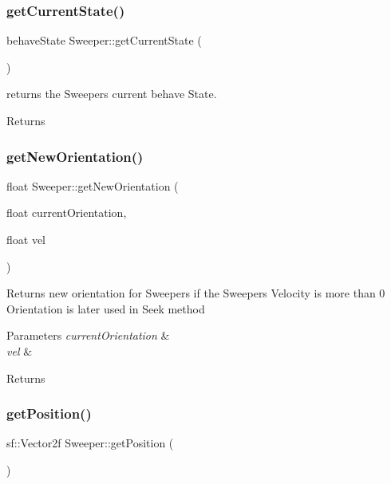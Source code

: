 \subsubsection{\texorpdfstring{getCurrentState()}{getCurrentState()}}
{\footnotesize\ttfamily behave\+State Sweeper\+::get\+Current\+State (\begin{DoxyParamCaption}{ }\end{DoxyParamCaption})}



returns the Sweepers current behave State. 

\begin{DoxyReturn}{Returns}

\end{DoxyReturn}
\mbox{\label{class_sweeper_a8bf97c85c79f5e2fef3c9822eb304596}} 
\subsubsection{\texorpdfstring{getNewOrientation()}{getNewOrientation()}}
{\footnotesize\ttfamily float Sweeper\+::get\+New\+Orientation (\begin{DoxyParamCaption}\item[{float}]{current\+Orientation,  }\item[{float}]{vel }\end{DoxyParamCaption})}



Returns new orientation for Sweepers if the Sweepers Velocity is more than 0 Orientation is later used in Seek method 


\begin{DoxyParams}{Parameters}
{\em current\+Orientation} & \\
\hline
{\em vel} & \\
\hline
\end{DoxyParams}
\begin{DoxyReturn}{Returns}

\end{DoxyReturn}
\mbox{\label{class_sweeper_a9fecea4436904ee3357a0b763f2c6c76}} 
\subsubsection{\texorpdfstring{getPosition()}{getPosition()}}
{\footnotesize\ttfamily sf\+::\+Vector2f Sweeper\+::get\+Position (\begin{DoxyParamCaption}{ }\end{DoxyParamCaption})}



